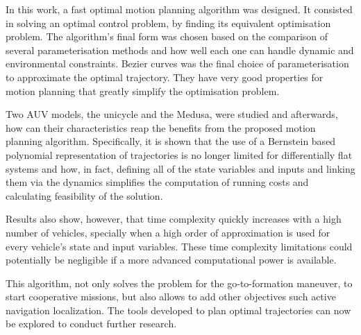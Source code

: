 \cleardoublepage%
\label{chap:conclusion}


\par In this work, a fast optimal motion planning algorithm was designed. It consisted in solving an optimal control problem, by finding its equivalent optimisation problem. The algorithm's final form was chosen based on the comparison of several parameterisation methods and how well each one can handle dynamic and environmental constraints. Bezier curves was the final choice of parameterisation to approximate the optimal trajectory. They have very good properties for motion planning that greatly simplify the optimisation problem.

Two \ac{AUV} models, the unicycle and the Medusa, were studied and afterwards, how can their characteristics reap the benefits from the proposed motion planning algorithm. Specifically, it is shown that the use of a Bernstein based polynomial representation of trajectories is no longer limited for differentially flat systems and how, in fact, defining all of the state variables and inputs and linking them via the dynamics simplifies the computation of running costs and calculating feasibility of the solution.
\par Results also show, however, that time complexity quickly increases with a high number of vehicles, specially when a high order of approximation is used for every vehicle's state and input variables. These time complexity limitations could potentially be negligible if a more advanced computational power is available.
\par This algorithm, not only solves the problem for the go-to-formation maneuver, to start cooperative missions, but also allows to add other objectives such active navigation localization. The tools developed to plan optimal trajectories can now be explored to conduct further research. 

